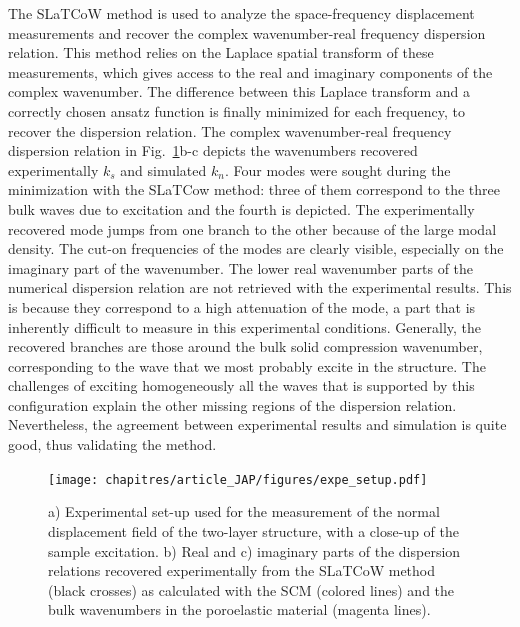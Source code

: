 The SLaTCoW method \cite{geslain2016} is used to analyze the space-frequency displacement measurements and recover the complex wavenumber-real frequency dispersion relation. This method relies on the Laplace spatial transform of these measurements, which gives access to the real and imaginary components of the complex wavenumber. The difference between this Laplace transform and a correctly chosen ansatz function is finally minimized for each frequency, to recover the dispersion relation.  The complex wavenumber-real frequency dispersion relation in Fig.~\ref{fig:expe}b-c depicts the wavenumbers recovered experimentally $k_s$ and simulated $k_n$. Four modes were sought during the minimization with the SLaTCow method: three of them correspond to the three bulk waves due to excitation and the fourth is depicted. The experimentally recovered mode jumps from one branch to the other because of the large modal density. The cut-on frequencies of the modes are clearly visible, especially on the imaginary part of the wavenumber. The lower real wavenumber parts of the numerical dispersion relation are not retrieved with the experimental results. This is because they correspond to a high attenuation of the mode, a part that is inherently difficult to measure in this experimental conditions. Generally, the recovered branches are those around the bulk solid compression wavenumber, corresponding to the wave that we most probably excite in the structure. The challenges of exciting homogeneously all the waves that is supported by this configuration explain the other missing regions of the dispersion relation.  Nevertheless, the agreement between experimental results and simulation is quite good, thus validating the method.
\begin{figure}
    \centering
    \texttt{[image: chapitres/article\_JAP/figures/expe\_setup.pdf]}
    \caption{a) Experimental set-up used for the measurement of the normal displacement field of the two-layer structure, with a close-up of the sample excitation. b) Real and c) imaginary parts of the dispersion relations recovered experimentally from the SLaTCoW method (black crosses) as calculated with the SCM (colored lines) and the bulk wavenumbers in the poroelastic material (magenta lines).}
    \label{fig:expe}
    \end{figure}

